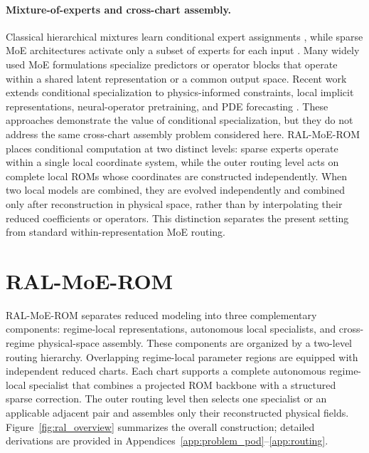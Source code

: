 \documentclass{article}
\begin{document}
\paragraph{Mixture-of-experts and cross-chart assembly.}
Classical hierarchical mixtures learn conditional expert assignments \citep{jacobs1991,jordan1994}, while sparse MoE architectures activate only a subset of experts for each input \citep{shazeer2017,fedus2022}. Many widely used MoE formulations specialize predictors or operator blocks that operate within a shared latent representation or a common output space. Recent work extends conditional specialization to physics-informed constraints, local implicit representations, neural-operator pretraining, and PDE forecasting \citep{ICLR2024_9aeda582,NEURIPS2024_b83fae17,NEURIPS2025_2d23a999,ICLR2026_754612bd}. These approaches demonstrate the value of conditional specialization, but they do not address the same cross-chart assembly problem considered here. RAL-MoE-ROM places conditional computation at two distinct levels: sparse experts operate within a single local coordinate system, while the outer routing level acts on complete local ROMs whose coordinates are constructed independently. When two local models are combined, they are evolved independently and
combined only after reconstruction in physical space, rather than by interpolating their reduced coefficients or operators. This distinction separates the present setting from standard within-representation MoE routing.

\section{RAL-MoE-ROM}
\label{sec:method}

RAL-MoE-ROM separates reduced modeling into three complementary components: regime-local representations, autonomous local specialists, and
cross-regime physical-space assembly. These components are organized by a two-level routing hierarchy. Overlapping regime-local parameter regions are equipped with independent reduced charts. Each chart supports a complete autonomous regime-local specialist that combines a projected ROM backbone with a structured sparse correction. The outer routing level then selects one specialist or an applicable adjacent pair and assembles only their reconstructed physical fields. Figure~\ref{fig:ral_overview} summarizes the overall construction; detailed
derivations are provided in Appendices~\ref{app:problem_pod}--\ref{app:routing}.
\end{document}
